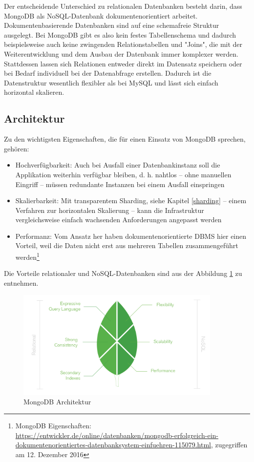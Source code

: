 Der entscheidende Unterschied zu relationalen Datenbanken besteht darin, dass MongoDB als NoSQL-Datenbank dokumentenorientiert arbeitet. Dokumentenbasierende Datenbanken sind auf eine schemafreie Struktur ausgelegt. Bei MongoDB gibt es also kein festes Tabellenschema und dadurch beispielsweise auch keine zwingenden Relationstabellen und "Joins", die mit der Weiterentwicklung und dem Ausbau der Datenbank immer komplexer werden. Stattdessen lassen sich Relationen entweder direkt im Datensatz speichern oder bei Bedarf individuell bei der Datenabfrage erstellen. Dadurch ist die Datenstruktur wesentlich flexibler als bei MySQL und lässt sich einfach horizontal skalieren.

\subsection{Architektur}
Zu den wichtigsten Eigenschaften, die für einen Einsatz von MongoDB sprechen, gehören:
\begin{itemize}
\item Hochverfügbarkeit: Auch bei Ausfall einer Datenbankinstanz soll die Applikation weiterhin verfügbar bleiben, d. h. nahtlos – ohne manuellen Eingriff – müssen redundante Instanzen bei einem Ausfall einspringen
\item Skalierbarkeit: Mit transparentem Sharding, siehe Kapitel \ref{sharding} – einem Verfahren zur horizontalen Skalierung – kann die Infrastruktur vergleichsweise einfach wachsenden Anforderungen angepasst werden
\item Performanz: Vom Ansatz her haben dokumentenorientierte DBMS hier einen Vorteil, weil die Daten nicht erst aus mehreren Tabellen zusammengeführt werden\footnote{MongoDB Eigenschaften: \url{https://entwickler.de/online/datenbanken/mongodb-erfolgreich-ein-dokumentenorientiertes-datenbanksystem-einfuehren-115079.html}, zugegriffen am 12. Dezember 2016}
\end{itemize}

Die Vorteile relationaler und NoSQL-Datenbanken sind aus der Abbildung \ref{img:architektur} zu entnehmen.
\begin{figure}
\centering
\includegraphics[width=0.9\textwidth]{resources/architectureNoSQLVSRelational}
\caption[MongoDB Architektur]{MongoDB Architektur\protect\footnotemark}
\label{img:architektur}
\end{figure}

